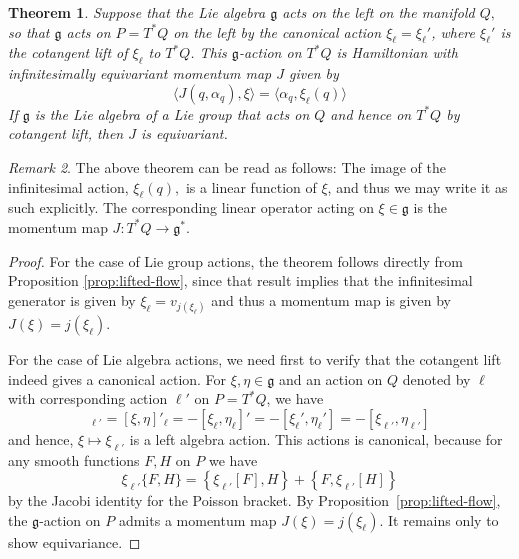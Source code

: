 \documentclass[a5paper,10pt,twoside]{article}
\theoremstyle{plain}
\newtheorem{teo}{Theorem}[section]
\theoremstyle{definition}
\theoremstyle{remark}
\newtheorem{rem}[teo]{Remark}
\begin{document}
\begin{teo}
\label{teo:cotangent-momentum-map}
Suppose that the Lie algebra $\mathfrak g$ acts on the left on the manifold $Q,$ so that $\mathfrak g$ acts on $P=T^*Q$ on the left by the canonical action $\xi_\ell=\xi_\ell'$, where $\xi_\ell'$ is the cotangent lift of $\xi_\ell$ to $T^*Q$.  This $\mathfrak{g}$-action on $T^*Q$ is Hamiltonian with infinitesimally equivariant momentum map $J$ given by 
%
\begin{equation}
\label{def:cotangent-momentum-map}
\langle J(q,\alpha_q),\xi\rangle = \langle \alpha_q, \xi_\ell(q)\rangle 
\end{equation}
%
If $\mathfrak{g}$ is the Lie algebra of a Lie group that acts on $Q$ and hence on $T^*Q$ by cotangent lift, then $J$ is equivariant.
\end{teo}

\begin{rem}
The above theorem can be read as follows: The image of the infinitesimal action, $\xi_\ell(q),$ is  a linear function of $\xi$, and thus we may write it as such explicitly. The corresponding linear operator acting on $\xi\in\mathfrak{g}$ is the momentum map $J:T^*Q\to \mathfrak{g}^*.$
\end{rem}

\begin{proof}
For the case of Lie group actions, the theorem follows directly from Proposition \ref{prop:lifted-flow}, since  that result implies that the infinitesimal generator is given by $\xi_\ell=v_{j(\xi_\ell)}$ and thus a momentum map is given by $J(\xi)=j(\xi_\ell)$.

For the case of Lie algebra actions, we need first to verify that the cotangent lift indeed gives a canonical action. For $\xi,\eta\in\mathfrak{g}$ and an action on $Q$ denoted by $\ell$ with corresponding action $\ell'$ on $P=T^*Q$, we have
%
\begin{equation}
[\xi,\eta]_{\ell'}=[\xi,\eta]'_\ell=-[\xi_\ell,\eta_\ell]'= -[\xi_\ell',\eta_\ell']=-[\xi_{\ell'},\eta_{\ell'}]
\end{equation}
%
and hence, $\xi\mapsto \xi_{\ell'}$ is a left algebra action. This actions is canonical, because for any smooth functions $F,H$ on $P$ we have
$$
\xi_{\ell'}\{F,H\}=\left\{\xi_{\ell'}[F],H\right\}+\left\{F,\xi_{\ell'}[H]\right\}
$$
by the Jacobi identity for the Poisson bracket. By Proposition~\ref{prop:lifted-flow}, the $\mathfrak{g}$-action on $P$ admits a momentum map $J(\xi)=j(\xi_\ell).$ It remains only to show equivariance.
\end{proof}
\end{document}

